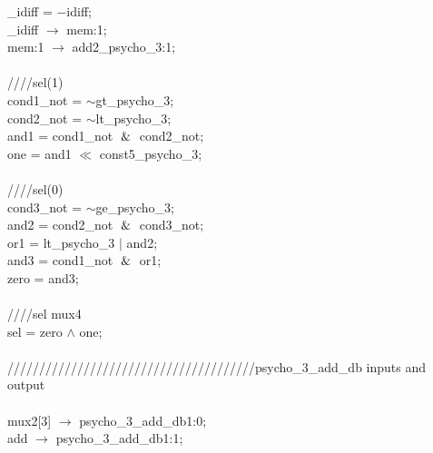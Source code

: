    \hspace*{2em}\_idiff = $-$idiff; \\
   \hspace*{2em}\_idiff $\rightarrow$ mem:1; \\
   \hspace*{2em}mem:1 $\rightarrow$ add2\_psycho\_3:1; \\
   \\
   \hspace*{2em}////sel(1) \\
   \hspace*{2em}cond1\_not = $\sim$gt\_psycho\_3; \\
   \hspace*{2em}cond2\_not = $\sim$lt\_psycho\_3; \\
   \hspace*{2em}and1 = cond1\_not $\And$ cond2\_not; \\
   \hspace*{2em}one = and1 $\ll$ const5\_psycho\_3; \\
   \\
   \hspace*{2em}////sel(0) \\
   \hspace*{2em}cond3\_not = $\sim$ge\_psycho\_3; \\
   \hspace*{2em}and2 = cond2\_not $\And$ cond3\_not; \\
   \hspace*{2em}or1 = lt\_psycho\_3 $\vert$ and2; \\
   \hspace*{2em}and3 = cond1\_not $\And$ or1; \\
   \hspace*{2em}zero = and3; \\
   \\
   \hspace*{2em}////sel mux4 \\
   \hspace*{2em}sel = zero $\wedge$ one; \\
   \\
   \hspace*{2em}///////////////////////////////////////psycho\_3\_add\_db inputs and output \\
   \\
   \hspace*{2em}mux2[3] $\rightarrow$ psycho\_3\_add\_db1:0; \\
   \hspace*{2em}add $\rightarrow$ psycho\_3\_add\_db1:1; \\
